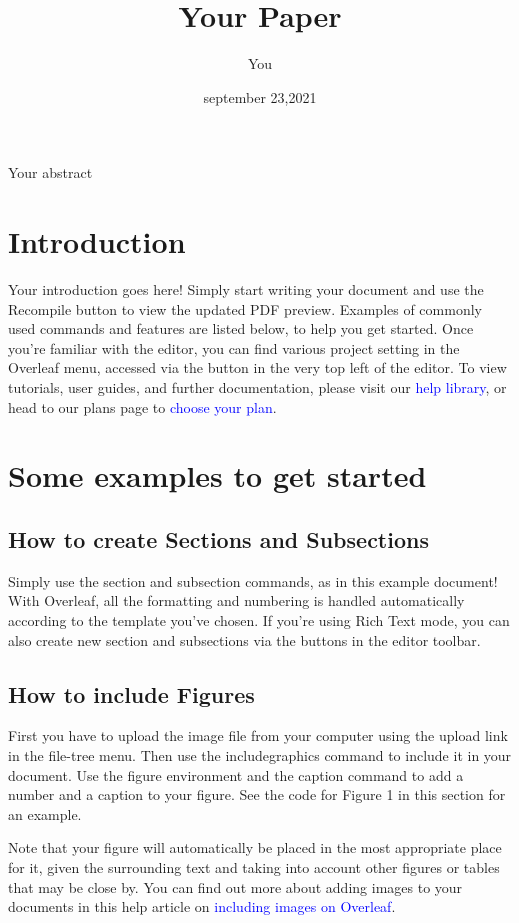 \documentclass{article}
\title{Your Paper}
\author{You}
\date{september 23,2021}
\begin{document}
	\maketitle
	\begin{abstract}
			\end{abstract}
	Your abstract
	\section{Introduction}
	Your introduction goes here! Simply start writing your document and use the Recompile button to
	view the updated PDF preview. Examples of commonly used commands and features are listed below,
	to help you get started.
	Once you’re familiar with the editor, you can find various project setting in the Overleaf menu,
	accessed via the button in the very top left of the editor. To view tutorials, user guides, and further
	documentation, please visit our \textcolor{blue}{help library}, or head to our plans page to \textcolor{blue}{choose your plan}.
	\section{Some examples to get started }
	\subsection{How to create Sections and Subsections}
	Simply use the section and subsection commands, as in this example document! With Overleaf, all
	the formatting and numbering is handled automatically according to the template you’ve chosen. If
	you’re using Rich Text mode, you can also create new section and subsections via the buttons in the
	editor toolbar.
	\subsection{How to include Figures}
	First you have to upload the image file from your computer using the upload link in the file-tree menu.
	Then use the includegraphics command to include it in your document. Use the figure environment
	and the caption command to add a number and a caption to your figure. See the code for Figure 1 in
	this section for an example.\par{}
	Note that your figure will automatically be placed in the most appropriate place for it, given the
	surrounding text and taking into account other figures or tables that may be close by. You can find
	out more about adding images to your documents in this help article on \textcolor{blue}{including images on Overleaf}.
\end{document}
